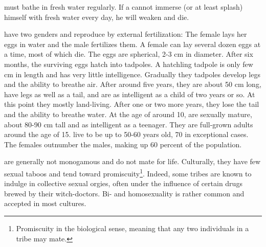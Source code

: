 
\Meccara{} must bathe in fresh water regularly. If a \meccaran{} cannot immerse (or at least splash) himself with fresh water every day, he will weaken and die. 

\Meccara{} have two genders and reproduce by external fertilization: The female lays her eggs in water and the male fertilizes them. A female can lay several dozen eggs at a time, most of which die. The eggs are spherical, 2-3 cm in diameter. After six months, the surviving eggs hatch into tadpoles. A hatchling tadpole is only few cm in length and has very little intelligence. Gradually they tadpoles develop legs and the ability to breathe air. After around five years, they are about 50 cm long, have legs as well as a tail, and are as intelligent as a \human{} child of two years or so. At this point they mostly land-living. After one or two more years, they lose the tail and the ability to breathe water. At the age of around 10, \meccara{} are sexually mature, about 80-90 cm tall and as intelligent as a \human{} teenager. They are full-grown adults around the age of 15. \Meccara{} live to be up to 50-60 years old, 70 in exceptional cases. The females outnumber the males, making up 60 percent of the population. 


\Meccara{} are generally not monogamous and do not mate for life. Culturally, they have few sexual taboos and tend toward promiscuity\footnote{Promiscuity in the biological sense, meaning that any two individuals in a tribe may mate.}. Indeed, some tribes are known to indulge in collective sexual orgies, often under the influence of certain drugs brewed by their witch-doctors. Bi- and homosexuality is rather common and accepted in most cultures. 









